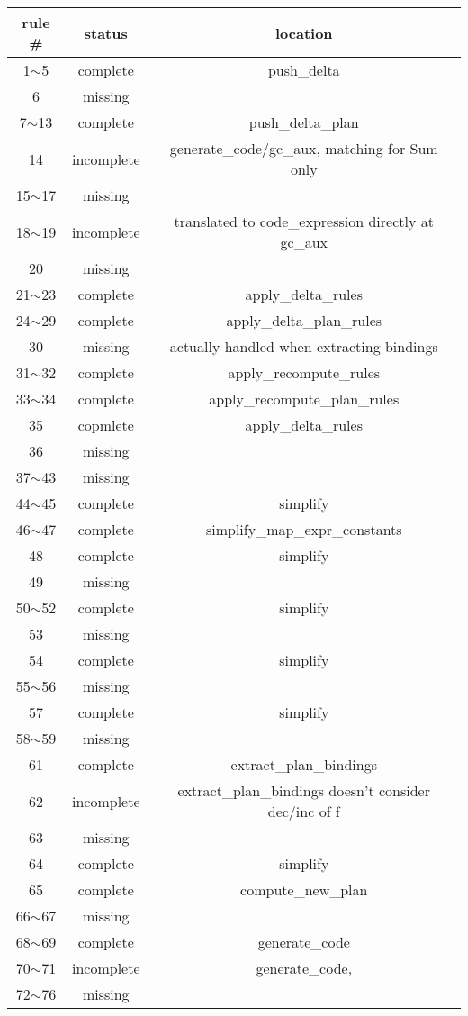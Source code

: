\documentclass{article}
\begin{document}
\begin{tabular} {|c|c|c|}
\hline rule \# & status & location  \\
\hline 1$\sim$5 & complete & push\_delta \\
\hline 6 & missing & \\
\hline 7$\sim$13 & complete & push\_delta\_plan\\
\hline 14 & incomplete & generate\_code/gc\_aux, matching for Sum only\\
\hline 15$\sim$17 & missing & \\
\hline 18$\sim$19 & incomplete & translated to code\_expression directly at gc\_aux\\
\hline 20 & missing & \\
\hline 21$\sim$23 & complete & apply\_delta\_rules\\
\hline 24$\sim$29 & complete & apply\_delta\_plan\_rules\\
\hline 30 & missing & actually handled when extracting bindings\\
\hline 31$\sim$32 & complete & apply\_recompute\_rules\\
\hline 33$\sim$34 & complete & apply\_recompute\_plan\_rules\\
\hline 35 & copmlete & apply\_delta\_rules\\
\hline 36 & missing & \\
\hline 37$\sim$43 & missing & \\
\hline 44$\sim$45 & complete & simplify \\
\hline 46$\sim$47 & complete & simplify\_map\_expr\_constants \\
\hline 48 & complete & simplify \\
\hline 49 & missing & \\
\hline 50$\sim$52 & complete & simplify \\
\hline 53 & missing & \\
\hline 54 & complete & simplify \\
\hline 55$\sim$56 & missing & \\
\hline 57 & complete & simplify \\
\hline 58$\sim$59 & missing & \\
\hline 61 & complete & extract\_plan\_bindings\\
\hline 62 & incomplete & extract\_plan\_bindings doesn't consider dec/inc of f\\
\hline 63 & missing &\\
\hline 64 & complete & simplify \\
\hline 65 & complete & compute\_new\_plan\\
\hline 66$\sim$67 & missing & \\
\hline 68$\sim$69 & complete & generate\_code\\
\hline 70$\sim$71 & incomplete & generate\_code, \\
\hline 72$\sim$76 & missing & \\
\hline

\end{tabular}
\end{document}

